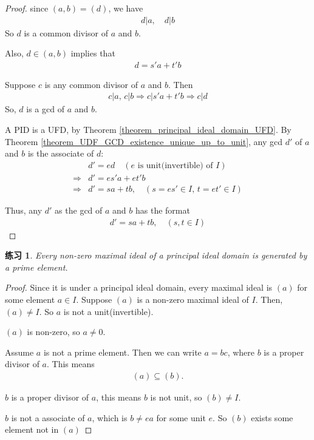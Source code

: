 \documentclass[utf8]{ctexbook}
\newtheorem{exercise}{练习}[section]
\begin{document}
\begin{proof}
since $(a,b)=(d)$, we have
\begin{align*}
d | a, \quad d | b
\end{align*}
So $d$ is a common divisor of $a$ and $b$.

Also, $d \in (a,b)$ implies that
\begin{align*}
d = s' a + t' b
\end{align*}

Suppose $c$ is any common divisor of $a$ and $b$. Then
\begin{align*}
c | a, \, c | b \Longrightarrow c|  s'a + t'b \Longrightarrow c | d
\end{align*}
So, $d$ is a gcd of $a$ and $b$.


A PID is a UFD, by Theorem \ref{theorem_principal_ideal_domain_UFD}. By Theorem \ref{theorem_UDF_GCD_existence_unique_up_to_unit}, any gcd $d'$ of $a$ and $b$ is the associate of $d$:
\begin{align*}
& d' = e d \quad (e \mbox{ is unit(invertible) of } I) \\
\Longrightarrow & d' = es' a + e t' b \\
\Longrightarrow & d' = s a + t b, \quad (s = e s' \in I, \, t = e t' \in I)
\end{align*}

Thus, any $d'$ as the gcd of $a$ and $b$ has the format
\begin{align*}
d' = s a + t b, \quad (s, t \in I)
\end{align*} 

\end{proof}


\begin{exercise}
Every non-zero maximal ideal of a principal ideal domain is generated by a prime element.
\end{exercise}

\begin{proof}
Since it is under a principal ideal domain, every maximal ideal is $(a)$ for some element $a \in I$. Suppose $(a)$ is a non-zero maximal ideal of $I$. Then, $(a) \neq I$. So $a$ is not a unit(invertible). 

$(a)$ is non-zero, so $a \neq 0$.

Assume $a$ is not a prime element. Then we can write $a= b c$, where $b$ is a proper divisor of $a$. This means
\begin{align*}
(a) \subseteq (b).
\end{align*}

$b$ is a proper divisor of $a$, this means $b$ is not unit, so $(b) \neq I$.

$b$ is not a associate of $a$, which is $b \neq e a $ for some unit $e$. So $(b)$ exists some element not in $(a)$

\end{proof}
\end{document}
